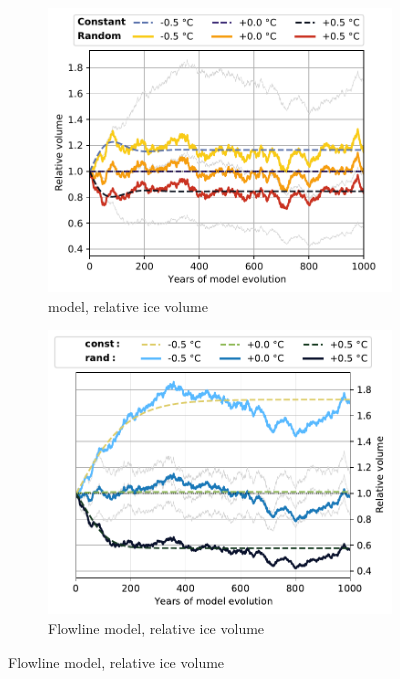         \begin{figure}[p]
          \centering

          \begin{subfigure}[b]{0.476\textwidth}
            \caption{\Vas{} model, relative ice volume}
            \label{fig:hintereisferner:volume_vas}
            \centering
            \includegraphics[width=\textwidth]{../plots/final_plots/time_series/single_glaciers/volume_norm_vas_Hintereisferner.pdf}
          \end{subfigure}
          \hfill
          \begin{subfigure}[b]{0.476\textwidth}
            \caption{Flowline model, relative ice volume}
            \label{fig:hintereisferner:volume_fl}
            \centering
            \includegraphics[width=\textwidth]{../plots/final_plots/time_series/single_glaciers/volume_norm_fl_Hintereisferner.pdf}
          \end{subfigure}


\end{figure}
